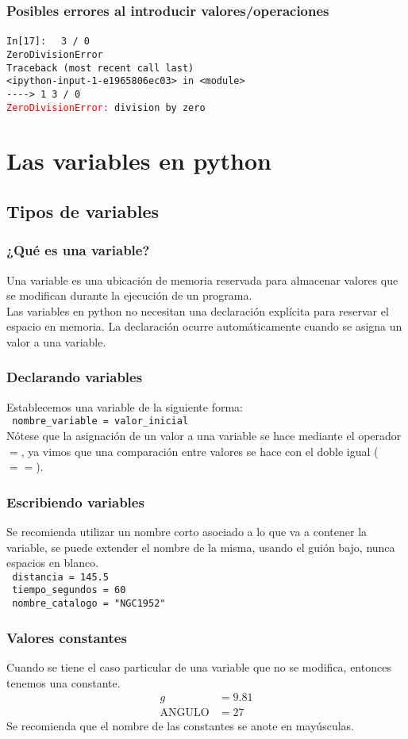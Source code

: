 \documentclass[12pt]{beamer}
\begin{document}
\begin{frame}[fragile]
\frametitle{Posibles errores al introducir valores/operaciones}
\textcolor{ao}{\texttt{In[17]: }} \verb| 3 / 0 | \\
\pause
{\fontsize{12}{12}\selectfont
\verb|ZeroDivisionError | \\
\verb|Traceback (most recent call last)| \\
\verb|<ipython-input-1-e1965806ec03> in <module>| \\
\verb|----> 1 3 / 0| \\
\textcolor{red}{\texttt{ZeroDivisionError:}}\verb| division by zero|}
\end{frame}
    

\section{Las variables en python}
\subsection{Tipos de variables}

\begin{frame}
\frametitle{¿Qué es una variable?}
Una variable es una ubicación de memoria reservada para almacenar valores que se modifican durante la ejecución de un programa.
\\
\bigskip
\pause
Las variables en python no necesitan una declaración explícita para reservar el espacio en memoria. La declaración ocurre automáticamente cuando se asigna un valor a una variable.
\end{frame}
\begin{frame}[fragile]
\frametitle{Declarando variables}
Establecemos una variable de la siguiente forma:
\\[1em]
\pause
\verb| nombre_variable = valor_inicial |
\\
\bigskip
Nótese que la asignación de un valor a una variable se hace mediante el operador $=$, ya vimos que una comparación entre valores se hace con el doble igual ($==$).
\end{frame}
\begin{frame}[fragile]
\frametitle{Escribiendo variables}
Se recomienda utilizar un nombre corto asociado a lo que va a contener la variable, se puede extender el nombre de la misma, usando el guión bajo, nunca espacios en blanco.
\\
\bigskip
\pause
\verb| distancia = 145.5 | \\
\verb| tiempo_segundos = 60 | \\
\verb| nombre_catalogo = "NGC1952" |
\end{frame}
\begin{frame}[fragile]
\frametitle{Valores constantes}
Cuando se tiene el caso particular de una variable que no se modifica, entonces tenemos una constante.
\pause
\begin{eqnarray*}
g &= 9.81 \\
\mbox{ANGULO} &= 27
\end{eqnarray*}
\pause 
Se recomienda que el nombre de las constantes se anote en mayúsculas.
\end{frame}
\end{document}
